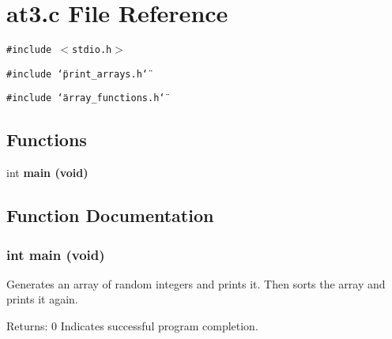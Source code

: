 \section{at3.c File Reference}
\label{at3_8c}
{\tt \#include $<$stdio.h$>$}\par
{\tt \#include \char`\"{}print\_\-arrays.h\char`\"{}}\par
{\tt \#include \char`\"{}array\_\-functions.h\char`\"{}}\par
\subsection*{Functions}
\begin{CompactItemize}
\item 
int \bf{main} (void)
\end{CompactItemize}


\subsection{Function Documentation}
\subsubsection{\setlength{\rightskip}{0pt plus 5cm}int main (void)}\label{at3_8c_5ad1c26f00c2399d3a5c7850100212d0}


Generates an array of random integers and prints it. Then sorts the array and prints it again. \begin{Desc}
\item[Returns:]0 Indicates successful program completion. \end{Desc}
